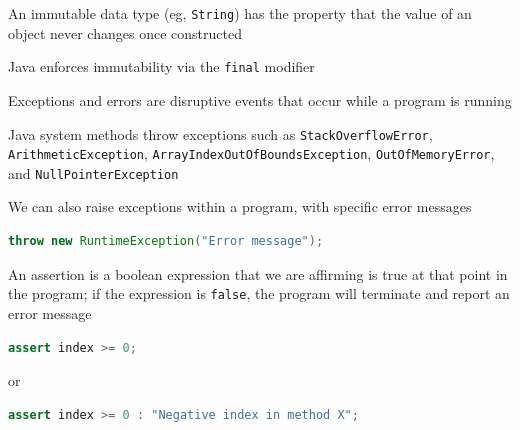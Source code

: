\documentclass[8pt,a4paper,compress]{beamer}
\begin{document}
\begin{frame}[fragile]
\pause

An immutable data type (eg, \lstinline{String}) has the property that the value of an object never changes once constructed

\pause\bigskip

Java enforces immutability via the \lstinline{final} modifier

\pause\bigskip

Exceptions and errors are disruptive events that occur while a program is running

\pause\bigskip

Java system methods throw exceptions such as  \lstinline{StackOverflowError}, \lstinline{ArithmeticException}, \lstinline{ArrayIndexOutOfBoundsException}, \lstinline{OutOfMemoryError}, and \lstinline{NullPointerException}

\pause\bigskip

We can also raise exceptions within a program, with specific error messages

\smallskip

\begin{lstlisting}[language=Java,style=focusin]
throw new RuntimeException("Error message");
\end{lstlisting}

\pause\bigskip

An assertion is a boolean expression that we are affirming is true at that point in the program; if the expression is \lstinline{false}, the program will terminate and report an error message

\smallskip

\begin{lstlisting}[language=Java,style=focusin]
assert index >= 0;
\end{lstlisting}

\smallskip

or

\smallskip

\begin{lstlisting}[language=Java,style=focusin]
assert index >= 0 : "Negative index in method X";
\end{lstlisting}
\end{frame}
\end{document}
